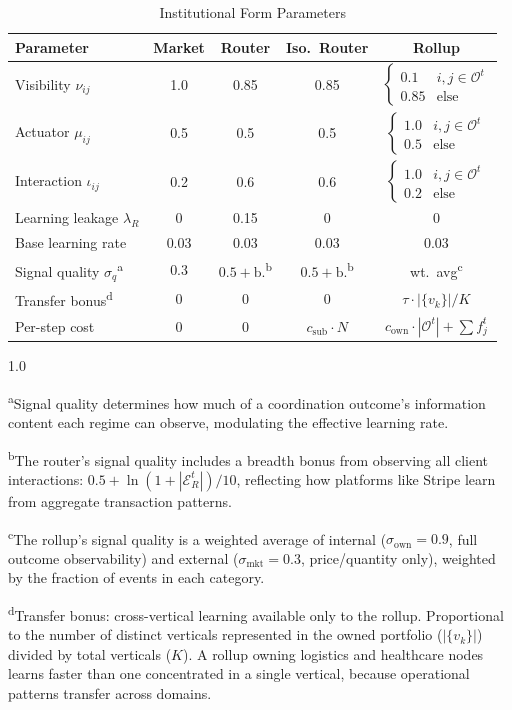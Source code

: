\documentclass[12pt]{article}
\theoremstyle{definition}
\begin{document}
\begin{table}[H]
\centering
\caption{Institutional Form Parameters}
\label{tab:params}
\begin{tabular}{lcccc}
\toprule
Parameter & Market & Router & Iso.\ Router & Rollup \\
\midrule
Visibility $\nu_{ij}$ & 1.0 & 0.85 & 0.85 & $\begin{cases} 0.1 & i,j \in \mathcal{O}^t \\ 0.85 & \text{else} \end{cases}$ \\[8pt]
Actuator $\mu_{ij}$ & 0.5 & 0.5 & 0.5 & $\begin{cases} 1.0 & i,j \in \mathcal{O}^t \\ 0.5 & \text{else} \end{cases}$ \\[8pt]
Interaction $\iota_{ij}$ & 0.2 & 0.6 & 0.6 & $\begin{cases} 1.0 & i,j \in \mathcal{O}^t \\ 0.2 & \text{else} \end{cases}$ \\[8pt]
Learning leakage $\lambda_R$ & 0 & 0.15 & 0 & 0 \\
Base learning rate & 0.03 & 0.03 & 0.03 & 0.03 \\
Signal quality $\sigma_q$\textsuperscript{a} & 0.3 & $0.5 + \text{b.}$\textsuperscript{b} & $0.5 + \text{b.}$\textsuperscript{b} & wt.\ avg\textsuperscript{c} \\
Transfer bonus\textsuperscript{d} & 0 & 0 & 0 & $\tau \cdot |\{v_k\}| / K$ \\
Per-step cost & 0 & 0 & $c_{\text{sub}} \cdot N$ & $c_{\text{own}} \cdot |\mathcal{O}^t| + \sum f_j^t$ \\
\bottomrule
\end{tabular}

\vspace{4pt}
\begin{spacing}{1.0}
{\small
\textsuperscript{a}Signal quality determines how much of a coordination outcome's information content each regime can observe, modulating the effective learning rate.

\textsuperscript{b}The router's signal quality includes a breadth bonus from observing all client interactions: $0.5 + \ln(1 + |\mathcal{E}^t_R|)/10$, reflecting how platforms like Stripe learn from aggregate transaction patterns.

\textsuperscript{c}The rollup's signal quality is a weighted average of internal ($\sigma_{\text{own}} = 0.9$, full outcome observability) and external ($\sigma_{\text{mkt}} = 0.3$, price/quantity only), weighted by the fraction of events in each category.

\textsuperscript{d}Transfer bonus: cross-vertical learning available only to the rollup. Proportional to the number of distinct verticals represented in the owned portfolio ($|\{v_k\}|$) divided by total verticals ($K$). A rollup owning logistics and healthcare nodes learns faster than one concentrated in a single vertical, because operational patterns transfer across domains.
}
\end{spacing}
\end{table}
\end{document}
